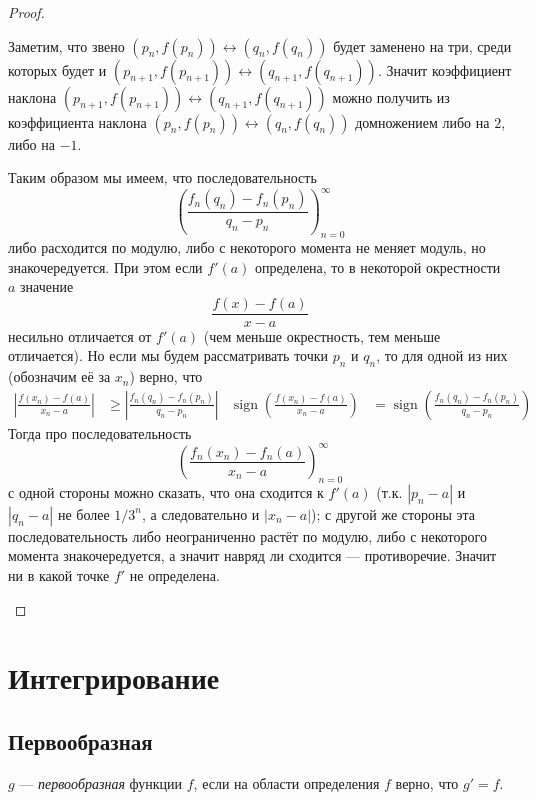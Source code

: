 \documentclass[12pt,a4paper]{article}
\DeclareMathOperator{\sign}{sign}
\begin{document}
\begin{proof}
\begin{enumerate}
                Заметим, что звено $(p_n, f(p_n)) \leftrightarrow (q_n, f(q_n))$ будет заменено на три, среди которых будет и $(p_{n+1}, f(p_{n+1})) \leftrightarrow (q_{n+1}, f(q_{n+1}))$. Значит коэффициент наклона $(p_{n+1}, f(p_{n+1})) \leftrightarrow (q_{n+1}, f(q_{n+1}))$ можно получить из коэффициента наклона $(p_n, f(p_n)) \leftrightarrow (q_n, f(q_n))$ домножением либо на $2$, либо на $-1$.

                Таким образом мы имеем, что последовательность
                \[\left(\frac{f_n(q_n) - f_n(p_n)}{q_n - p_n}\right)_{n=0}^\infty\]
                либо расходится по модулю, либо с некоторого момента не меняет модуль, но знакочередуется. При этом если $f'(a)$ определена, то в некоторой окрестности $a$ значение
                \[\frac{f(x) - f(a)}{x-a}\]
                несильно отличается от $f'(a)$ (чем меньше окрестность, тем меньше отличается). Но если мы будем рассматривать точки $p_n$ и $q_n$, то для одной из них (обозначим её за $x_n$) верно, что
                \begin{align*}
                    \left|\frac{f(x_n) - f(a)}{x_n-a}\right| &\geqslant \left|\frac{f_n(q_n) - f_n(p_n)}{q_n - p_n}\right|&
                    \sign\left(\frac{f(x_n) - f(a)}{x_n-a}\right) &= \sign\left(\frac{f_n(q_n) - f_n(p_n)}{q_n - p_n}\right)
                \end{align*}
                Тогда про последовательность
                \[\left(\frac{f_n(x_n) - f_n(a)}{x_n - a}\right)_{n=0}^\infty\]
                с одной стороны можно сказать, что она сходится к $f'(a)$ (т.к. $|p_n - a|$ и $|q_n - a|$ не более $1/3^n$, а следовательно и $|x_n - a|$); с другой же стороны эта последовательность либо неограниченно растёт по модулю, либо с некоторого момента знакочередуется, а значит навряд ли сходится --- противоречие. Значит ни в какой точке $f'$ не определена.
        \end{enumerate}
    \end{proof}

    \section{Интегрирование}

    \subsection{Первообразная}

    \begin{definition}
        $g$ --- \emph{первообразная} функции $f$, если на области определения $f$ верно, что $g' = f$.
    \end{definition}
\end{document}
